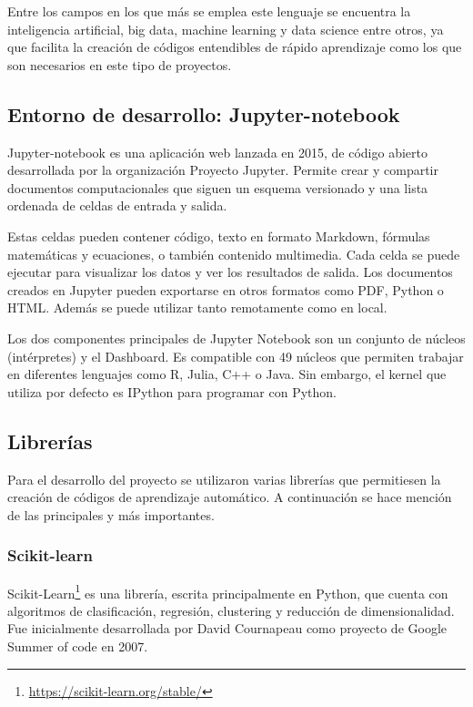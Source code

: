 \documentclass[a4paper, 12pt]{book}
\begin{document}
Entre los campos en los que más se emplea este lenguaje se encuentra la inteligencia artificial, big data, machine learning y data science entre otros, ya que facilita la creación de códigos entendibles de rápido aprendizaje como los que son necesarios en este tipo de proyectos.

\subsection{Entorno de desarrollo: Jupyter-notebook}
\label{subsec:entorno_de_desarrollo}

Jupyter-notebook es una aplicación web lanzada en 2015, de código abierto desarrollada por la organización Proyecto Jupyter. Permite crear y compartir documentos computacionales que siguen un esquema versionado y una lista ordenada de celdas de entrada y salida.

Estas celdas pueden contener código, texto en formato Markdown, fórmulas matemáticas y ecuaciones, o también contenido multimedia. Cada celda se puede ejecutar para visualizar los datos y ver los resultados de salida. Los documentos creados en Jupyter pueden exportarse en otros formatos como PDF, Python o HTML. Además se puede utilizar tanto remotamente como en local.

Los dos componentes principales de Jupyter Notebook son un conjunto de núcleos (intérpretes) y el Dashboard. Es compatible con 49 núcleos que permiten trabajar en diferentes lenguajes como R, Julia, C++ o Java. Sin embargo, el kernel que utiliza por defecto es IPython para programar con Python. 

\subsection{Librerías}
\label{subsec:Librerías}
Para el desarrollo del proyecto se utilizaron varias librerías que permitiesen la creación de códigos de aprendizaje automático. A continuación se hace mención de las principales y más importantes.

\subsubsection{Scikit-learn}
\label{subsubsec:Scikit-learn}
Scikit-Learn\footnote{\url{https://scikit-learn.org/stable/}} es una librería, escrita principalmente en Python, que cuenta con algoritmos de clasificación, regresión, clustering y reducción de dimensionalidad. Fue inicialmente desarrollada por David Cournapeau como proyecto de Google Summer of code en 2007.
\end{document}
